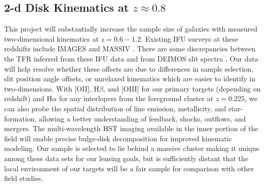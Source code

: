 \documentclass[12pt]{article}
\begin{document}
\subsection{2-d Disk Kinematics at $z\approx0.8$}

This project will substantially increase the sample size of galaxies with measured two-dimensional kinematics at $z=0.6-1.2$. Existing IFU surveys at these redshifts include IMAGES \citep[N=63;][]{Flores2006, Yang2008} and MASSIV \citep[N=84;][]{Contini2012}. There are some discrepancies between the TFR inferred from these IFU data and from DEIMOS slit spectra \citep[e.g. Figure 12 of][]{Kassin2012}. Our data will help resolve whether these offsets are due to differences in sample selection, slit position angle offsets, or unrelaxed kinematics which are easier to identify in two-dimensions. With [OII], H$\beta$, and [OIII] for our primary targets (depending on redshift) and H$\alpha$ for any interlopers from the foreground cluster at $z=0.225$, we can also probe the spatial distribution of line emission, metallicity, and star-formation, allowing a better understanding of feedback, shocks, outflows, and mergers. The multi-wavelength HST imaging available in the inner portion of the field will enable precise bulge-disk decomposition for improved kinematic modeling. Our sample is selected to lie behind a massive cluster making it unique among these data sets for our lensing goals, but is sufficiently distant that the local environment of our targets will be a fair sample for comparison with other field studies.

\newpage
\end{document}
